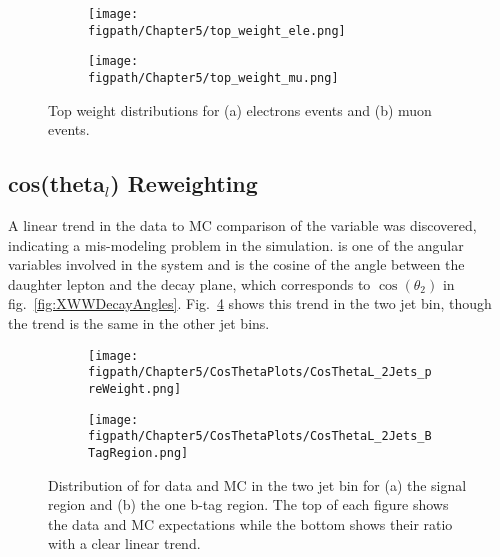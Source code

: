 \begin{figure}[!hbt]
    \centering
    \begin{subfigure}[t]{0.48\textwidth}
      \texttt{[image: \\figpath/Chapter5/top\_weight\_ele.png]}
      \caption{}
      \label{fig:top_pt_weights_ele}
    \end{subfigure}
    \begin{subfigure}[t]{0.48\textwidth}
      \texttt{[image: \\figpath/Chapter5/top\_weight\_mu.png]}
      \caption{}
      \label{fig:top_pt_weights_mu}
    \end{subfigure}
    \caption{Top \pt weight distributions for (a) electrons events and (b) muon events.}
    \label{fig:top_pt_weights}
\end{figure}

\subsection{\texorpdfstring{cos(theta$_l$)}{CosThetaL} Reweighting}
\label{sec:costhetal_reweighting}

A linear trend in the data to MC comparison of the \costhetal variable was discovered, indicating a mis-modeling problem in the simulation.
\costhetal is one of the angular variables involved in the \WW system and is the cosine of the angle between the daughter lepton and the \WW decay plane, which corresponds to $\cos\left(\theta_{2}\right)$ in fig.~\ref{fig:XWWDecayAngles}.
Fig.~\ref{fig:cos_theta_l_preweight_signal} shows this trend in the two jet bin, though the trend is the same in the other jet bins.

\begin{figure}[!hbt]
    \centering
    \begin{subfigure}[t]{0.48\textwidth}
      \texttt{[image: \\figpath/Chapter5/CosThetaPlots/CosThetaL\_2Jets\_preWeight.png]}
      \caption{}
      \label{fig:cos_theta_l_preweight_signal}
    \end{subfigure}
    \begin{subfigure}[t]{0.48\textwidth}
      \texttt{[image: \\figpath/Chapter5/CosThetaPlots/CosThetaL\_2Jets\_BTagRegion.png]}
      \caption{}
      \label{fig:cos_theta_l_preweight_1btag}
    \end{subfigure}
    \caption{Distribution of \costhetal for data and MC in the two jet bin for (a) the signal region and (b) the one b-tag region. The top of each figure shows the data and MC expectations while the bottom shows their ratio with a clear linear trend.}
    \label{fig:cos_theta_l_preweight}
\end{figure}

